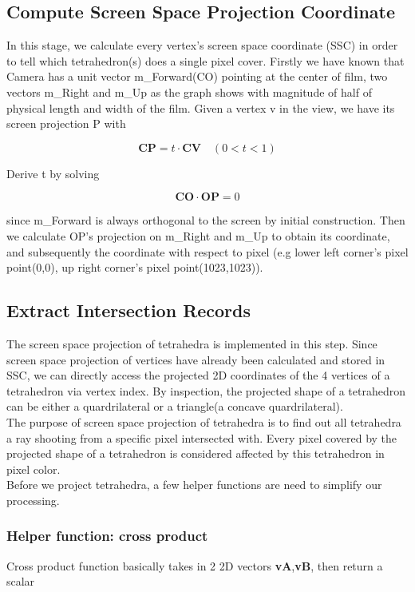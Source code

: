 \documentclass[acmtog]{acmart}
\begin{document}
\subsection{Compute Screen Space Projection Coordinate}
In this stage, we calculate every vertex’s screen space coordinate (SSC) in order to tell which tetrahedron(s) does a single pixel cover. Firstly we have known that Camera has a unit vector m\_Forward(CO) pointing at the center of film, two vectors m\_Right and m\_Up as the graph shows with magnitude of half of physical length and width of the film. Given a vertex v in the view, we have its screen projection P with 

\begin{equation} 
\boldsymbol {CP} = t 
\cdot
\boldsymbol{CV}
\quad (0<t<1)
\end{equation} 

Derive t by solving 

\begin{equation} 
\boldsymbol {CO}
\cdot 
\boldsymbol{OP}=0
\end{equation} 

since m\_Forward is always orthogonal to the screen by initial construction. Then we calculate OP’s projection on m\_Right and m\_Up to obtain its coordinate, and subsequently the coordinate with respect to pixel (e.g lower left corner’s pixel point(0,0), up right corner’s pixel point(1023,1023)). 
\\
\subsection{Extract Intersection Records}
The screen space projection of tetrahedra is implemented in this step. Since screen space projection of vertices have already been calculated and stored in SSC, we can directly access the projected 2D coordinates of the 4 vertices of a tetrahedron via vertex index. By inspection, the projected shape of a tetrahedron can be either a quardrilateral or a triangle(a concave quardrilateral).
\\The purpose of screen space projection of tetrahedra is to find out all tetrahedra a ray shooting from a specific pixel intersected with. Every pixel covered by the projected shape of a tetrahedron is considered affected by this tetrahedron in pixel color.
\\Before we project tetrahedra, a few helper functions are need to simplify our processing.
\\
\subsubsection{Helper function: cross product}
Cross product function basically takes in 2 2D vectors 
\textbf {vA},\textbf {vB}, then return a scalar
\end{document}
